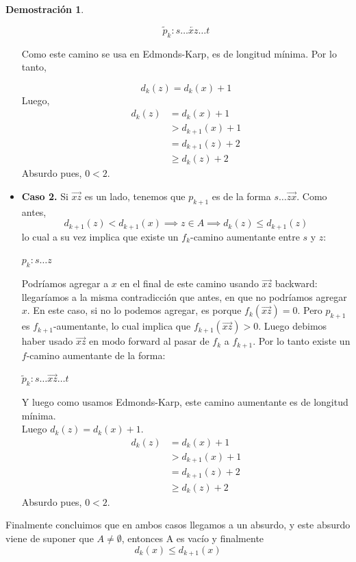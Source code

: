 \documentclass[11pt, a4paper]{article}
\theoremstyle{definition}
\newtheorem*{demostracion}{Demostración}
\begin{document}
\begin{demostracion}
\begin{itemize}
        \[ 
        \tilde{p}_k : s \ldots \overleftarrow{xz} \ldots t 
        \]
        
        Como este camino se usa en Edmonds-Karp, es de longitud mínima. Por lo tanto,
        
        \[ d_k(z) = d_k(x) + 1 \]Luego,
        \begin{align*}
            d_k(z) & = d_k(x) + 1 \\
                   & > d_{k+1}(x) + 1 \\
                   & = d_{k+1}(z) + 2 \\
                   & \geq d_k(z) + 2
        \end{align*}
        Absurdo pues, $0 < 2$.
        


        \item \textbf{Caso 2.} Si $\overrightarrow{xz}$ es un lado, tenemos que $p_{k+1}$ es de la forma $s \ldots \overrightarrow{zx}$. Como antes, 
        \[ d_{k+1}(z) < d_{k+1}(x) \implies z \in A \implies d_k(z) \leq d_{k+1}(z) \]
        lo cual a su vez implica que existe un $f_k$-camino aumentante entre $s$ y $z$:
        \begin{center}
            $p_k: s \ldots z$
        \end{center}
        Podríamos agregar a $x$ en el final de este camino usando $\overrightarrow{xz}$ backward: llegaríamos a la misma contradicción que antes, en 
        que no podríamos agregar $x$. En este caso, si no lo podemos agregar, es porque $f_k(\overrightarrow{xz})=0$. Pero $p_{k+1}$ es 
        $f_{k+1}$-aumentante, lo cual implica que $f_{k+1}(\overrightarrow{xz})>0$. Luego debimos haber usado $\overrightarrow{xz}$ en modo forward al 
        pasar de $f_k$ a $f_{k+1}$. Por lo tanto existe un $f$-camino aumentante de la forma:
        \begin{center}
            $\tilde{p}_k: s \ldots \overrightarrow{xz} \ldots t$
        \end{center}
        Y luego como usamos Edmonds-Karp, este camino aumentante es de longitud mínima.\\
        Luego $d_k(z) = d_k(x) + 1$.\\
        \begin{align*}
            d_k(z) & = d_k(x) + 1 \\
                   & > d_{k+1}(x) + 1 \\
                   & = d_{k+1}(z) + 2 \\
                   & \geq d_k(z) + 2
        \end{align*}
        Absurdo pues, $0 < 2$. 
    \end{itemize}
    Finalmente concluimos que en ambos casos llegamos a un absurdo, y este absurdo viene de suponer que \({A \ne \emptyset}\), entonces A es vacío y finalmente 
    \[ d_k(x) \leq d_{k+1}(x) \]
\end{demostracion}
\end{document}
